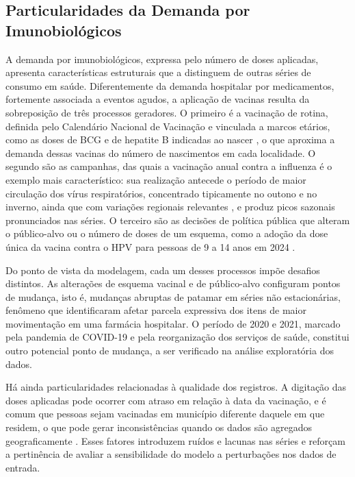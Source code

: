 \documentclass[
    12pt,
    openright,
    oneside,
    a4paper,
    english,
    brazil
]{abntex2}
\begin{document}
\subsection{Particularidades da Demanda por Imunobiológicos}
\label{subsec:particularidades}

A demanda por imunobiológicos, expressa pelo número de doses aplicadas, apresenta características estruturais que a distinguem de outras séries de consumo em saúde. Diferentemente da demanda hospitalar por medicamentos, fortemente associada a eventos agudos, a aplicação de vacinas resulta da sobreposição de três processos geradores. O primeiro é a vacinação de rotina, definida pelo Calendário Nacional de Vacinação e vinculada a marcos etários, como as doses de BCG e de hepatite B indicadas ao nascer \cite{BrasilCalendario2026}, o que aproxima a demanda dessas vacinas do número de nascimentos em cada localidade. O segundo são as campanhas, das quais a vacinação anual contra a influenza é o exemplo mais característico: sua realização antecede o período de maior circulação dos vírus respiratórios, concentrado tipicamente no outono e no inverno, ainda que com variações regionais relevantes \cite{SBIm2026}, e produz picos sazonais pronunciados nas séries. O terceiro são as decisões de política pública que alteram o público-alvo ou o número de doses de um esquema, como a adoção da dose única da vacina contra o HPV para pessoas de 9 a 14 anos em 2024 \cite{BrasilNT412024}.

Do ponto de vista da modelagem, cada um desses processos impõe desafios distintos. As alterações de esquema vacinal e de público-alvo configuram pontos de mudança, isto é, mudanças abruptas de patamar em séries não estacionárias, fenômeno que  identificaram afetar parcela expressiva dos itens de maior movimentação em uma farmácia hospitalar. O período de 2020 e 2021, marcado pela pandemia de COVID-19 e pela reorganização dos serviços de saúde, constitui outro potencial ponto de mudança, a ser verificado na análise exploratória dos dados.

Há ainda particularidades relacionadas à qualidade dos registros. A digitação das doses aplicadas pode ocorrer com atraso em relação à data da vacinação, e é comum que pessoas sejam vacinadas em município diferente daquele em que residem, o que pode gerar inconsistências quando os dados são agregados geograficamente \cite{Lopes2022}. Esses fatores introduzem ruídos e lacunas nas séries e reforçam a pertinência de avaliar a sensibilidade do modelo a perturbações nos dados de entrada.
\end{document}
